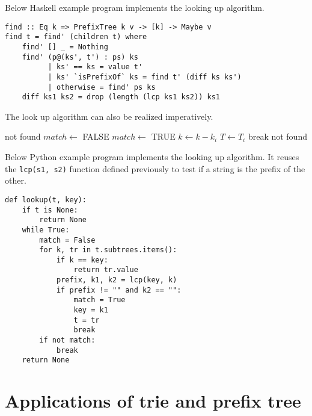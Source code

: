 \documentclass{article}
\begin{document}
Below Haskell example program implements the looking up algorithm.

\lstset{language=Haskell}
\begin{lstlisting}
find :: Eq k => PrefixTree k v -> [k] -> Maybe v
find t = find' (children t) where
    find' [] _ = Nothing
    find' (p@(ks', t') : ps) ks
          | ks' == ks = value t'
          | ks' `isPrefixOf` ks = find t' (diff ks ks')
          | otherwise = find' ps ks
    diff ks1 ks2 = drop (length (lcp ks1 ks2)) ks1
\end{lstlisting}

The look up algorithm can also be realized imperatively.

\begin{algorithmic}[1]
     \State \Return not found
   \EndIf
  \Repeat
    \State $match \gets$ FALSE
        \State \Return {}
      \EndIf
        \State $match \gets$ TRUE
        \State $k \gets k - k_i$
        \State $T \gets T_i$
        \State break
      \EndIf
    \EndFor
  \State \Return not found
\EndFunction
\end{algorithmic}

Below Python example program implements the looking up algorithm.
It reuses the \texttt{lcp(s1, s2)} function
defined previously to test if a string is the prefix of the other.

\lstset{language=Python}
\begin{lstlisting}
def lookup(t, key):
    if t is None:
        return None
    while True:
        match = False
        for k, tr in t.subtrees.items():
            if k == key:
                return tr.value
            prefix, k1, k2 = lcp(key, k)
            if prefix != "" and k2 == "":
                match = True
                key = k1
                t = tr
                break
        if not match:
            break
    return None
\end{lstlisting}



\section{Applications of trie and prefix tree}
\end{document}

